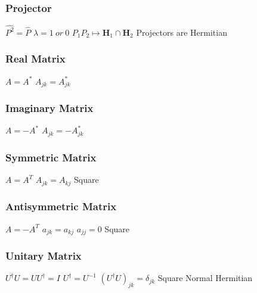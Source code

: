 \subsubsection{Projector}					
\begin{itemize}
\itemt \( \hat{P^2} = \hat{P} \)
\itemt \( \lambda = 1\ or\ 0 \)
\itemt \( P_1P_2 \mapsto \mathbf{H}_1 \cap \mathbf{H}_2 \)
\itemt Projectors are Hermitian
\end{itemize}			

\subsubsection{Real Matrix}				
\begin{itemize}
\itemt \( A=A^* \)
\itemt \( A_{jk} = A^*_{jk} \)
\end{itemize}				

\subsubsection{Imaginary Matrix}			
\begin{itemize}
\itemt \( A=-A^* \)
\itemt \( A_{jk}=-A^*_{jk} \)
\end{itemize}				

\subsubsection{Symmetric Matrix}			
\begin{itemize}
\itemt \( A=A^T \)
\itemt \( A_{jk} = A_{kj} \)
\itemt Square
\end{itemize}				

\subsubsection{Antisymmetric Matrix}			
\begin{itemize}
\itemt \( A=-A^T \)
\itemt \( a_{jk} = a_{kj} \)
\itemt \( a_{jj} = 0 \)
\itemt Square
\end{itemize}		

\subsubsection{Unitary Matrix}			
\begin{itemize}
\itemt \( {U}^\dagger {U} = {U}{U}^\dagger = I \)
\itemt \( {U}^\dagger = {U}^{-1} \)
\itemt \( ({U}^\dagger {U})_{jk} = \delta_{jk} \)
\itemt Square
\itemt Normal
\itemt Hermitian
\end{itemize}					


